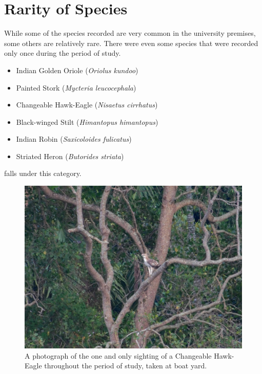 \section{Rarity of Species}
While some of the species recorded are very common in the university premises, some others are relatively rare. There were even some species that were recorded only once during the period of study.
\begin{itemize}
    \item Indian Golden Oriole (\textit{Oriolus kundoo})
    \item Painted Stork (\textit{Mycteria leucocephala})
    \item Changeable Hawk-Eagle (\textit{Nisaetus cirrhatus})
    \item Black-winged Stilt (\textit{Himantopus himantopus})
    \item Indian Robin (\textit{Saxicoloides fulicatus})
    \item Striated Heron (\textit{Butorides striata})
\end{itemize}
falls under this category.
\begin{figure}[!htpb]
    \centering
    \includegraphics[width=\linewidth]{Figures/crested-hawk.jpg}
    \caption[]{A photograph of the one and only sighting of a Changeable Hawk-Eagle throughout the period of study, taken at boat yard.}
    \label{fig:figure-01}
\end{figure}

